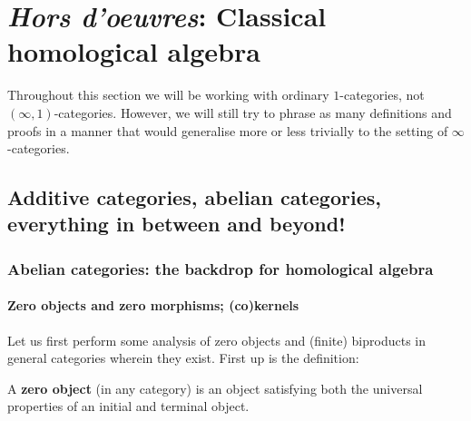 \section{\textit{Hors d'oeuvres}: Classical homological algebra} \label{section: homological_algebra}
    \begin{convention}
        Throughout this section we will be working with ordinary $1$-categories, not $(\infty, 1)$-categories. However, we will still try to phrase as many definitions and proofs in a manner that would generalise more or less trivially to the setting of $\infty$-categories.
    \end{convention}

    \subsection{Additive categories, abelian categories, everything in between and beyond!}
        \subsubsection{Abelian categories: the backdrop for homological algebra}
            \paragraph{Zero objects and zero morphisms; (co)kernels}
                Let us first perform some analysis of zero objects and (finite) biproducts in general categories wherein they exist. First up is the definition:
                \begin{definition} \label{def: zero_objects} 
                    A \textbf{zero object} (in any category) is an object satisfying both the universal properties of an initial and terminal object.
                \end{definition}
                
                

